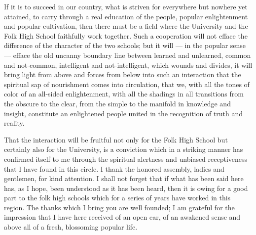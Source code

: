 \documentclass[12pt,a4paper,openany]{book}
\newcommand{\opage}[1]{\marginnote{\footnotesize\textit{[#1]}}}
\begin{document}
If it is to succeed in our country, what is striven for everywhere
but nowhere yet attained, to carry through
a real education of the people, popular enlightenment and
popular cultivation, then there must be a field where
the University and the Folk High School faithfully work together.
Such a cooperation will not efface the difference
of the character of the two schools; but it will --- in
the popular sense --- efface the old uncanny
boundary line between learned and unlearned, common and
not-common, intelligent and not-intelligent, which wounds
\setcounter{footnote}{0}%
\opage{138}and divides, it will bring light from above and forces
from below into such an interaction that the spiritual
sap of nourishment comes into circulation, that we, with all the
tones of color of an all-sided enlightenment, with all the shadings in
all transitions from the obscure to the clear, from the
simple to the manifold in knowledge and insight,
constitute an enlightened people united in the recognition of truth
and reality.

That the interaction will be fruitful not only
for the Folk High School but certainly also for the University,
is a conviction which in a striking manner has
confirmed itself to me through the spiritual alertness and
unbiased receptiveness that I have found in this circle.
I thank the honored assembly, ladies and gentlemen,
for kind attention. I shall not
forget that if what has been said here has, as I hope,
been understood as it has been heard, then it is
owing for a good part to the folk high schools which for a
series of years have worked in this region. The thanks which I
bring you are well founded; I am grateful for
the impression that I have here received of an open ear, of
an awakened sense and above all of a fresh, blossoming
popular life.
\end{document}
